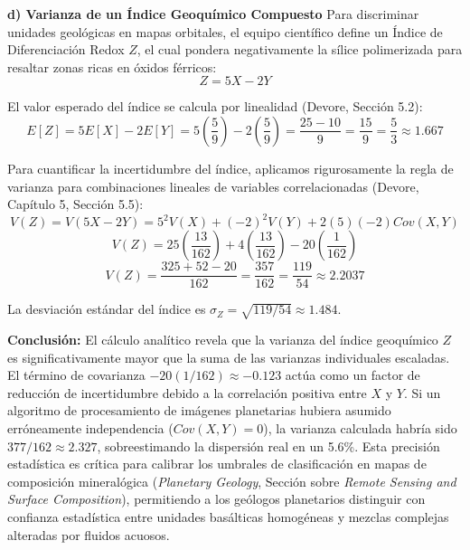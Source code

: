 \textbf{d) Varianza de un Índice Geoquímico Compuesto}
Para discriminar unidades geológicas en mapas orbitales, el equipo científico define un Índice de Diferenciación Redox $Z$, el cual pondera negativamente la sílice polimerizada para resaltar zonas ricas en óxidos férricos:
$$ Z = 5X - 2Y $$

El valor esperado del índice se calcula por linealidad (Devore, Sección 5.2):
$$ E[Z] = 5E[X] - 2E[Y] = 5\left(\frac{5}{9}\right) - 2\left(\frac{5}{9}\right) = \frac{25 - 10}{9} = \frac{15}{9} = \frac{5}{3} \approx 1.667 $$

Para cuantificar la incertidumbre del índice, aplicamos rigurosamente la regla de varianza para combinaciones lineales de variables correlacionadas (Devore, Capítulo 5, Sección 5.5):
$$ V(Z) = V(5X - 2Y) = 5^2 V(X) + (-2)^2 V(Y) + 2(5)(-2) Cov(X,Y) $$
$$ V(Z) = 25\left(\frac{13}{162}\right) + 4\left(\frac{13}{162}\right) - 20\left(\frac{1}{162}\right) $$
$$ V(Z) = \frac{325 + 52 - 20}{162} = \frac{357}{162} = \frac{119}{54} \approx 2.2037 $$

La desviación estándar del índice es $\sigma_Z = \sqrt{119/54} \approx 1.484$.

\textbf{Conclusión:}
El cálculo analítico revela que la varianza del índice geoquímico $Z$ es significativamente mayor que la suma de las varianzas individuales escaladas. El término de covarianza $-20(1/162) \approx -0.123$ actúa como un factor de reducción de incertidumbre debido a la correlación positiva entre $X$ y $Y$. Si un algoritmo de procesamiento de imágenes planetarias hubiera asumido erróneamente independencia ($Cov(X,Y)=0$), la varianza calculada habría sido $377/162 \approx 2.327$, sobreestimando la dispersión real en un 5.6\%. Esta precisión estadística es crítica para calibrar los umbrales de clasificación en mapas de composición mineralógica (\textit{Planetary Geology}, Sección sobre \textit{Remote Sensing and Surface Composition}), permitiendo a los geólogos planetarios distinguir con confianza estadística entre unidades basálticas homogéneas y mezclas complejas alteradas por fluidos acuosos.